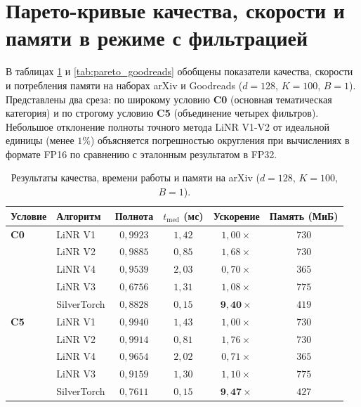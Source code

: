 \documentclass[14pt,a4paper]{extreport}
\numberwithin{figure}{chapter}
\numberwithin{table}{chapter}
\numberwithin{equation}{chapter}
\begin{document}
\section{Парето-кривые качества, скорости и памяти в режиме с фильтрацией}

В таблицах \ref{tab:pareto_arxiv} и \ref{tab:pareto_goodreads} обобщены показатели качества, скорости и потребления памяти на наборах arXiv и Goodreads ($d=128$, $K=100$, $B=1$). Представлены два среза: по широкому условию \textbf{C0} (основная тематическая категория) и по строгому условию \textbf{C5} (объединение четырех фильтров). Небольшое отклонение полноты точного метода LiNR V1-V2 от идеальной единицы (менее $1\%$) объясняется погрешностью округления при вычислениях в формате FP16 по сравнению с эталонным результатом в FP32.

\begin{table}[htbp]
    \caption{Результаты качества, времени работы и памяти на arXiv ($d=128$, $K=100$, $B=1$).}
    \label{tab:pareto_arxiv}
    \centering
    \begin{tabular}{llcccc}
        \toprule
        Условие & Алгоритм & Полнота & $t_\mathrm{med}$ (мс) & Ускорение & Память (МиБ) \\
        \midrule
        \textbf{C0} & LiNR V1 & $0{,}9923$ & $1{,}42$ & $1{,}00\times$ & $730$ \\
        & LiNR V2 & $0{,}9885$ & $0{,}85$ & $1{,}68\times$ & $730$ \\
        & LiNR V4 & $0{,}9539$ & $2{,}03$ & $0{,}70\times$ & $365$ \\
        & LiNR V3 & $0{,}6756$ & $1{,}31$ & $1{,}08\times$ & $775$ \\
        & SilverTorch & $0{,}8828$ & $0{,}15$ & $\mathbf{9{,}40\times}$ & $419$ \\
        \midrule
        \textbf{C5} & LiNR V1 & $0{,}9940$ & $1{,}43$ & $1{,}00\times$ & $730$ \\
        & LiNR V2 & $0{,}9914$ & $0{,}81$ & $1{,}76\times$ & $730$ \\
        & LiNR V4 & $0{,}9654$ & $2{,}02$ & $0{,}71\times$ & $365$ \\
        & LiNR V3 & $0{,}9159$ & $1{,}30$ & $1{,}10\times$ & $775$ \\
        & SilverTorch & $0{,}7611$ & $0{,}15$ & $\mathbf{9{,}47\times}$ & $427$ \\
        \bottomrule
    \end{tabular}
\end{table}
\end{document}
